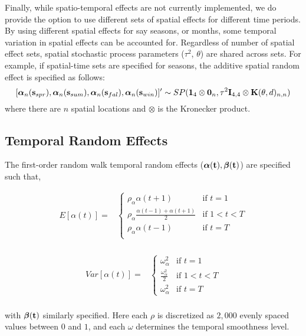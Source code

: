 Finally, while spatio-temporal effects are not currently implemented, we do provide the option to use different sets of spatial effects for different time periods. 
By using different spatial effects for say seasons, or months, some temporal variation in spatial effects can be accounted for.
Regardless of number of spatial effect sets, spatial stochastic process parameters ($\tau^2$, $\theta$) are shared across sets. 
For example, if spatial-time sets are specified for seasons, the additive spatial random effect is specified as follows:
\[
    [\boldsymbol{\alpha}_n(\mathbf{s}_{spr}), 
        \boldsymbol{\alpha}_n(\mathbf{s}_{sum}),
        \boldsymbol{\alpha}_n(\mathbf{s}_{fal}),
        \boldsymbol{\alpha}_n(\mathbf{s}_{win})]' \sim SP(\mathbf{1}_4 \otimes \mathbf{0}_n, \tau^2 \mathbf{I}_{4,4} \otimes \mathbf{K}(\theta, d)_{n,n})
\]
where there are $n$ spatial locations and $\otimes$ is the Kronecker product.

\subsection*{Temporal Random Effects}

The first-order random walk temporal random effects ($\boldsymbol{\alpha}(\mathbf{t}), \boldsymbol{\beta}(\mathbf{t})$) are specified such that,

\begin{align*}
    E[\alpha(t)] =& 
    \begin{cases} 
        \rho_{\alpha} \alpha(t+1) & \text{if } t = 1 \\ 
        \rho_{\alpha} \frac{\alpha(t-1) + \alpha(t+1)}{2} & \text{if } 1 < t < T \\
        \rho_{\alpha} \alpha(t-1) & \text{if } t = T \\
    \end{cases} \\
\end{align*}

\begin{align*}
    Var[\alpha(t)] =& 
    \begin{cases} 
        \omega^2_{\alpha} & \text{if } t = 1 \\
        \frac{\omega^2_{\alpha}}{2} & \text{if } 1 < t < T \\
        \omega^2_{\alpha} & \text{if } t = T
    \end{cases} \\
\end{align*}

with $\boldsymbol{\beta}(\mathbf{t})$ similarly specified. 
Here each $\rho$ is discretized as $2,000$ evenly spaced values between $0$ and $1$, and each $\omega$ determines the temporal smoothness level. 

